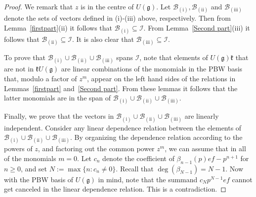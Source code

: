 \documentclass[10pt,a4paper]{amsart}
\newcommand{\cI}{\mathcal I}
\newcommand{\g}{\mathfrak}
\newcommand{\sseq}{\subseteq}
\begin{document}
\begin{proof}
We remark that $z$ is in the centre of $U(\g g)$.
Let $\mathcal B_\mathrm{(i)},\mathcal B_\mathrm{(ii)}$
and 
$\mathcal B_\mathrm{(iii)}$ denote the sets of vectors defined in (i)-(iii) above, respectively. Then from Lemma~\ref{firstpart}(ii) it follows that $\mathcal B_\mathrm{(i)}\sseq \cI$. From Lemma~\ref{Second part}(iii) it follows that $\mathcal B_\mathrm{(ii)}\sseq \cI$. It is also clear that $\mathcal B_\mathrm{(iii)}\sseq\cI$.  

To prove that $\mathcal B_\mathrm{(i)}\cup\mathcal B_\mathrm{(ii)}\cup\mathcal B_\mathrm{(iii)}$ spans $\cI$, note that elements of $U(\g g)\g k$ that are not in $\g kU(\g g)$ are linear combinations of the
 monomials in the PBW basis that, modulo a factor of $z^m$,  appear on  the left hand sides of the relations in Lemmas~\ref{firstpart} and~\ref{Second part}. 
From these lemmas it follows that the latter monomials are in the span of $\mathcal B_\mathrm{(i)}\cup\mathcal B_\mathrm{(ii)}\cup\mathcal B_\mathrm{(iii)}$.

Finally, we prove that the vectors
in $\mathcal B_\mathrm{(i)}\cup\mathcal B_\mathrm{(ii)}\cup\mathcal B_\mathrm{(iii)}$
 are linearly independent. Consider any  linear dependence relation between the elements of 
$\mathcal B_\mathrm{(i)}\cup\mathcal B_\mathrm{(ii)}\cup\mathcal B_\mathrm{(iii)}$.  
By organizing the dependence relation according to the powers of $z$, and factoring out the common power $z^m$, we can assume that in all of the monomials $m=0$. 
  Let $c_n$ denote the coefficient of $\beta_{n-1}(p)ef-p^{n+1}$ for $n\geq 0$, and set $N:=\max\{n:c_n\neq 0\}$. Recall that $\deg(\beta_{N-1})=N-1$. Now with the PBW basis of $U(\g g)$ in mind, note that the summand $c_Np^{N-1}ef$ cannot get canceled in the linear dependence relation. This is a contradiction. 
\end{proof}
\end{document}
